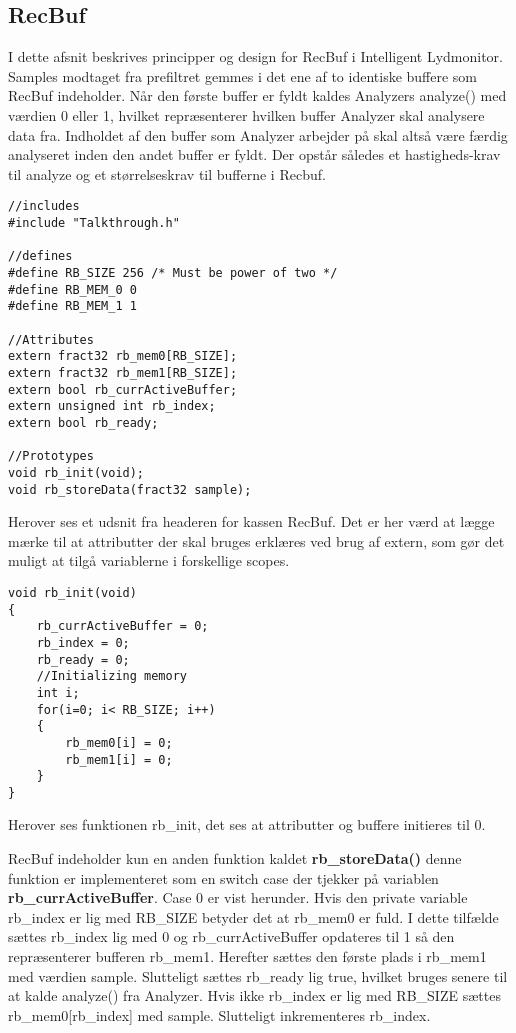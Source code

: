 \subsection{RecBuf}
I dette afsnit beskrives principper og design for RecBuf i Intelligent Lydmonitor.
Samples modtaget fra prefiltret gemmes i det ene af to identiske buffere som RecBuf indeholder. Når den første buffer er fyldt kaldes Analyzers analyze() med værdien 0 eller 1, hvilket repræsenterer hvilken buffer Analyzer skal analysere data fra. Indholdet af den buffer som Analyzer arbejder på skal altså være færdig analyseret inden den andet buffer er fyldt. Der opstår således et hastigheds-krav til analyze og et størrelseskrav til bufferne i Recbuf. 

\begin{verbatim}
//includes
#include "Talkthrough.h"

//defines
#define RB_SIZE 256 /* Must be power of two */
#define RB_MEM_0 0
#define RB_MEM_1 1

//Attributes
extern fract32 rb_mem0[RB_SIZE];
extern fract32 rb_mem1[RB_SIZE];
extern bool rb_currActiveBuffer;
extern unsigned int rb_index;
extern bool rb_ready;

//Prototypes
void rb_init(void);
void rb_storeData(fract32 sample);
\end{verbatim}

Herover ses et udsnit fra headeren for kassen RecBuf. Det er her værd at lægge mærke til at attributter der skal bruges erklæres ved brug af extern, som gør det muligt at tilgå variablerne i forskellige scopes. 

\begin{verbatim}
void rb_init(void)
{
    rb_currActiveBuffer = 0;
    rb_index = 0;
    rb_ready = 0;
    //Initializing memory
    int i;
    for(i=0; i< RB_SIZE; i++)
    {
        rb_mem0[i] = 0;
        rb_mem1[i] = 0;
    }
}
\end{verbatim}

Herover ses funktionen rb\_init, det ses at attributter og buffere initieres til 0.

RecBuf indeholder kun en anden funktion kaldet \textbf{rb\_storeData()} denne funktion er implementeret som en switch case der tjekker på variablen \textbf{rb\_currActiveBuffer}. Case 0 er vist herunder. 
Hvis den private variable rb\_index er lig med RB\_SIZE betyder det at rb\_mem0 er fuld. I dette tilfælde sættes rb\_index lig med 0 og rb\_currActiveBuffer opdateres til 1 så den repræsenterer bufferen rb\_mem1. Herefter sættes den første plads i rb\_mem1 med værdien sample. Slutteligt sættes rb\_ready lig true, hvilket bruges senere til at kalde analyze() fra Analyzer. Hvis ikke rb\_index er lig med RB\_SIZE sættes rb\_mem0[rb\_index] med sample. Slutteligt inkrementeres rb\_index. 

